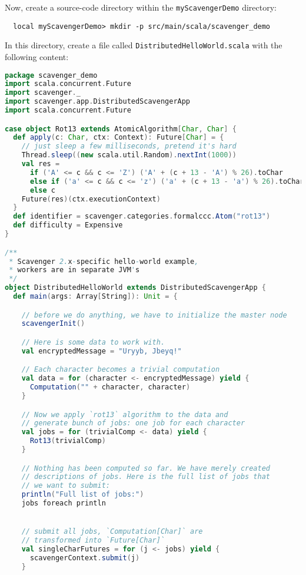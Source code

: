 \documentclass{scrbook}
\begin{document}
Now, create a source-code directory within the \lstinline{myScavengerDemo}
directory:
\begin{lstlisting}
  local myScavengerDemo> mkdir -p src/main/scala/scavenger_demo
\end{lstlisting}
In this directory, create a file called \lstinline{DistributedHelloWorld.scala}
with the following content:

\begin{lstlisting}[language=scala]
package scavenger_demo
import scala.concurrent.Future
import scavenger._
import scavenger.app.DistributedScavengerApp
import scala.concurrent.Future

case object Rot13 extends AtomicAlgorithm[Char, Char] {
  def apply(c: Char, ctx: Context): Future[Char] = {
    // just sleep a few milliseconds, pretend it's hard
    Thread.sleep((new scala.util.Random).nextInt(1000)) 
    val res = 
      if ('A' <= c && c <= 'Z') ('A' + (c + 13 - 'A') % 26).toChar
      else if ('a' <= c && c <= 'z') ('a' + (c + 13 - 'a') % 26).toChar
      else c
    Future(res)(ctx.executionContext)
  }
  def identifier = scavenger.categories.formalccc.Atom("rot13")
  def difficulty = Expensive
}

/**
 * Scavenger 2.x-specific hello-world example,
 * workers are in separate JVM's
 */
object DistributedHelloWorld extends DistributedScavengerApp {
  def main(args: Array[String]): Unit = {

    // before we do anything, we have to initialize the master node
    scavengerInit()

    // Here is some data to work with.
    val encryptedMessage = "Uryyb, Jbeyq!"

    // Each character becomes a trivial computation
    val data = for (character <- encryptedMessage) yield {
      Computation("" + character, character)
    }

    // Now we apply `rot13` algorithm to the data and 
    // generate bunch of jobs: one job for each character
    val jobs = for (trivialComp <- data) yield {
      Rot13(trivialComp)
    }

    // Nothing has been computed so far. We have merely created
    // descriptions of jobs. Here is the full list of jobs that
    // we want to submit:
    println("Full list of jobs:")
    jobs foreach println


    // submit all jobs, `Computation[Char]` are 
    // transformed into `Future[Char]`
    val singleCharFutures = for (j <- jobs) yield {
      scavengerContext.submit(j)
    }
 

\end{lstlisting}
\end{document}
